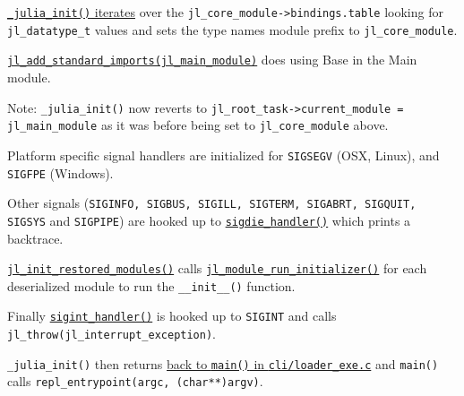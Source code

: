 \href{https://github.com/JuliaLang/julia/blob/master/src/init.c}{\texttt{\_julia\_init()} iterates} over the \texttt{jl\_core\_module->bindings.table} looking for \texttt{jl\_datatype\_t} values and sets the type name{\textquotesingle}s module prefix to \texttt{jl\_core\_module}.



\href{https://github.com/JuliaLang/julia/blob/master/src/toplevel.c}{\texttt{jl\_add\_standard\_imports(jl\_main\_module)}} does {\textquotedbl}using Base{\textquotedbl} in the {\textquotedbl}Main{\textquotedbl} module.



Note: \texttt{\_julia\_init()} now reverts to \texttt{jl\_root\_task->current\_module = jl\_main\_module} as it was before being set to \texttt{jl\_core\_module} above.



Platform specific signal handlers are initialized for \texttt{SIGSEGV} (OSX, Linux), and \texttt{SIGFPE} (Windows).



Other signals (\texttt{SIGINFO, SIGBUS, SIGILL, SIGTERM, SIGABRT, SIGQUIT, SIGSYS} and \texttt{SIGPIPE}) are hooked up to \href{https://github.com/JuliaLang/julia/blob/master/src/signals-unix.c}{\texttt{sigdie\_handler()}} which prints a backtrace.



\href{https://github.com/JuliaLang/julia/blob/master/src/staticdata.c}{\texttt{jl\_init\_restored\_modules()}} calls \href{https://github.com/JuliaLang/julia/blob/master/src/module.c}{\texttt{jl\_module\_run\_initializer()}} for each deserialized module to run the \texttt{\_\_init\_\_()} function.



Finally \href{https://github.com/JuliaLang/julia/blob/master/src/signals-unix.c}{\texttt{sigint\_handler()}} is hooked up to \texttt{SIGINT} and calls \texttt{jl\_throw(jl\_interrupt\_exception)}.



\texttt{\_julia\_init()} then returns \href{https://github.com/JuliaLang/julia/blob/master/cli/loader\_exe.c}{back to \texttt{main()} in \texttt{cli/loader\_exe.c}} and \texttt{main()} calls \texttt{repl\_entrypoint(argc, (char**)argv)}.



